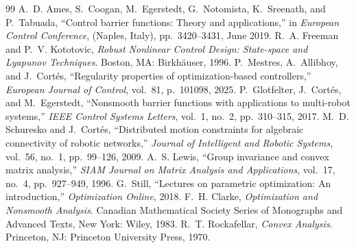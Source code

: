 \documentclass[10pt,a4paper]{amsart}
\theoremstyle{definition}
\begin{document}
\begin{thebibliography}{99}
 A.~D. Ames, S.~Coogan, M.~Egerstedt, G.~Notomista, K.~Sreenath, and P.~Tabuada, ``Control barrier functions: Theory and applications,'' in {\em {E}uropean {C}ontrol {C}onference}, (Naples, Italy), pp.~3420--3431, June 2019.
 R.~A. Freeman and P.~V. Kototovic, {\em Robust Nonlinear Control Design: State-space and {L}yapunov Techniques}. \newblock Boston, MA: Birkh{\"a}user, 1996.
 P.~Mestres, A.~Allibhoy, and J.~Cortés, ``Regularity properties of optimization-based controllers,'' {\em European Journal of Control}, vol.~81, p.~101098, 2025.
 P.~Glotfelter, J.~Cort\'es, and M.~Egerstedt, ``Nonsmooth barrier functions with applications to multi-robot systems,'' {\em IEEE Control Systems Letters}, vol.~1, no.~2, pp.~310--315, 2017.
 M.~D. Schuresko and J.~Cort{\'e}s, ``Distributed motion constraints for algebraic connectivity of robotic networks,'' {\em Journal of Intelligent and Robotic Systems}, vol.~56, no.~1, pp.~99--126, 2009.
 A.~S. Lewis, ``Group invariance and convex matrix analysis,'' {\em SIAM Journal on Matrix Analysis and Applications}, vol.~17, no.~4, pp.~927--949, 1996.
 G.~Still, ``Lectures on parametric optimization: An introduction,'' {\em Optimization Online}, 2018.
 F.~H. Clarke, {\em Optimization and Nonsmooth Analysis}. \newblock Canadian Mathematical Society Series of Monographs and Advanced Texts, New York: Wiley, 1983.
 R.~T. Rockafellar, {\em Convex Analysis}. \newblock Princeton, NJ: Princeton University Press, 1970.
\end{thebibliography}
\end{document}
